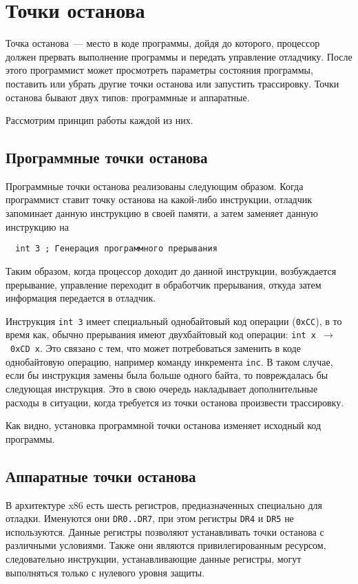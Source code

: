 
\section{Точки останова}
Точка останова~--- место в коде программы, дойдя до которого, процессор должен
прервать выполнение программы и передать управление отладчику. После этого
программист может просмотреть параметры состояния программы, поставить или
убрать другие точки останова или запустить трассировку. Точки останова бывают
двух типов: программные и аппаратные.

Рассмотрим принцип работы каждой из них.

\subsection{Программные точки останова}
Программные точки останова реализованы следующим образом. Когда программист
ставит точку останова на какой-либо инструкции, отладчик запоминает данную
инструкцию в своей памяти, а затем заменяет данную инструкцию на 
\begin{verbatim}
  int 3 ; Генерация программного прерывания
\end{verbatim}
Таким образом, когда процессор доходит до данной инструкции, возбуждается
прерывание, управление переходит в обработчик прерывания, откуда затем
информация передается в отладчик. 

Инструкция \verb!int 3! имеет специальный однобайтовый код операции
(\verb!0xCC!), в то время как, обычно прерывания имеют двухбайтовый код
операции: \verb!int x!~$\to$~\verb!0xCD x!. Это связано с тем, что может
потребоваться заменить в коде однобайтовую операцию, например команду инкремента
\verb!inc!. В таком случае, если бы инструкция замены была больше одного
байта, то повреждалась бы следующая инструкция. Это в свою очередь накладывает
дополнительные расходы в ситуации, когда требуется из точки останова произвести
трассировку.

Как видно, установка программной точки останова изменяет исходный код
программы.

\subsection{Аппаратные точки останова}
В архитектуре x86 есть шесть регистров, предназначенных специально для отладки.
Именуются они \verb!DR0..DR7!, при этом регистры \verb!DR4! и \verb!DR5! не
используются. Данные регистры позволяют устанавливать точки останова с
различными условиями. Также они являются привилегированным ресурсом,
следовательно инструкции, устанавливающие данные регистры, могут выполняться
только с нулевого уровня защиты.

